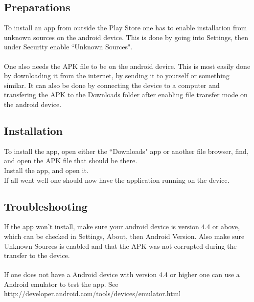 \subsection{Preparations}
To install an app from outside the Play Store one has to enable installation from unknown sources on the android device. This is done by going into Settings, then under Security enable ``Unknown Sources".
\\
\\
One also needs the APK file to be on the android device. This is most easily done by downloading it from the internet, by sending it to yourself or something similar. It can also be done by connecting the device to a computer and transfering the APK to the Downloads folder after enabling file transfer mode on the android device.

\subsection{Installation}
To install the app, open either the ``Downloads" app or another file browser, find, and open the APK file that should be there.\\
Install the app, and open it.\\
If all went well one should now have the application running on the device.
\subsection{Troubleshooting}
If the app won't install, make sure your android device is version 4.4 or above, which can be checked in Settings, About, then Android Version. Also make sure Unknown Sources is enabled and that the APK was not corrupted during the transfer to the device.\\\\
If one does not have a Android device with version 4.4 or higher one can use a Android emulator to test the app. See  http://developer.android.com/tools/devices/emulator.html